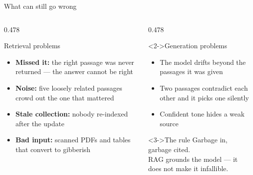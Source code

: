 \documentclass[aspectratio=169,11pt]{beamer}
\begin{document}
\begin{frame}{What can still go wrong}
  \begin{columns}[T,onlytextwidth]
    \begin{column}{0.478\textwidth}
      \begin{alertblock}{Retrieval problems}
        \begin{itemize}
          \item \textbf{Missed it:} the right passage was never returned ---
                the answer cannot be right
          \item \textbf{Noise:} five loosely related passages crowd out the
                one that mattered
          \item \textbf{Stale collection:} nobody re-indexed after the update
          \item \textbf{Bad input:} scanned PDFs and tables that convert to
                gibberish
        \end{itemize}
      \end{alertblock}
    \end{column}
    \begin{column}{0.478\textwidth}
      \begin{alertblock}<2->{Generation problems}
        \begin{itemize}
          \item The model drifts beyond the passages it was given
          \item Two passages contradict each other and it picks one silently
          \item Confident tone hides a weak source
        \end{itemize}
      \end{alertblock}
      \begin{block}<3->{The rule}
        \centering
        Garbage in, garbage cited. \\
        RAG grounds the model --- it does not make it infallible.
      \end{block}
    \end{column}
  \end{columns}
\end{frame}
\end{document}
